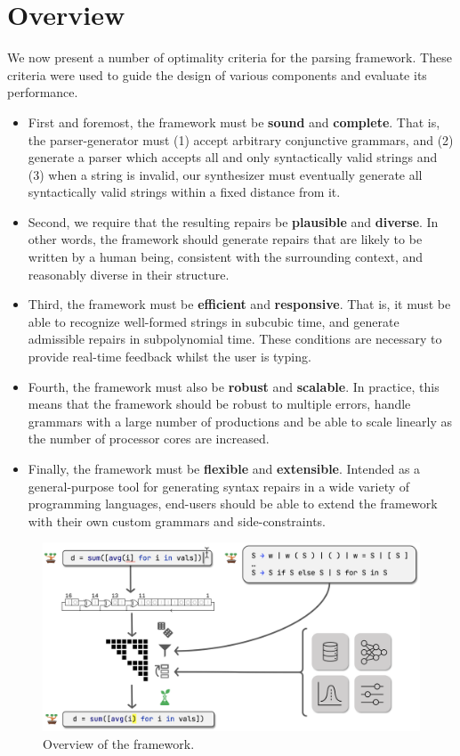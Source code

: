 \documentclass[sigplan,review,anonymous,acmsmall]{acmart}\settopmatter{printfolios=false,printccs=false,printacmref=false}
\begin{document}
\section{Overview}

We now present a number of optimality criteria for the parsing framework. These criteria were used to guide the design of various components and evaluate its performance.

\begin{itemize}
  \item First and foremost, the framework must be \textbf{sound} and \textbf{complete}. That is, the parser-generator must (1) accept arbitrary conjunctive grammars, and (2) generate a parser which accepts all and only syntactically valid strings and (3) when a string is invalid, our synthesizer must eventually generate all syntactically valid strings within a fixed distance from it.
  \item Second, we require that the resulting repairs be \textbf{plausible} and \textbf{diverse}. In other words, the framework should generate repairs that are likely to be written by a human being, consistent with the surrounding context, and reasonably diverse in their structure.
  \item Third, the framework must be \textbf{efficient} and \textbf{responsive}. That is, it must be able to recognize well-formed strings in subcubic time, and generate admissible repairs in subpolynomial time. These conditions are necessary to provide real-time feedback whilst the user is typing.
  \item Fourth, the framework must also be \textbf{robust} and \textbf{scalable}. In practice, this means that the framework should be robust to multiple errors, handle grammars with a large number of productions and be able to scale linearly as the number of processor cores are increased.
  \item Finally, the framework must be \textbf{flexible} and \textbf{extensible}. Intended as a general-purpose tool for generating syntax repairs in a wide variety of programming languages, end-users should be able to extend the framework with their own custom grammars and side-constraints.
\end{itemize}

\begin{figure}[t]
  \centering
  \includegraphics[width=0.6\linewidth]{../figures/architecture_overview.png}
  \caption{Overview of the framework.}
  \label{fig:overview}
\end{figure}
\end{document}
